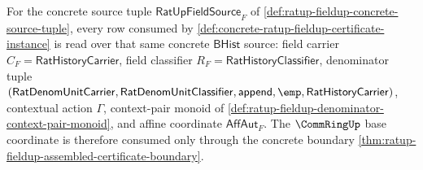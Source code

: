 \begin{theorem}
\label{thm:ratup-fieldup-certificate-rows-source-anchored}
For the concrete source tuple $\mathsf{RatUpFieldSource}_F$ of
\autoref{def:ratup-fieldup-concrete-source-tuple}, every row consumed by
\autoref{def:concrete-ratup-fieldup-certificate-instance} is read over that
same concrete $\mathsf{BHist}$ source: field carrier
$C_F=\mathsf{RatHistoryCarrier}$, field classifier
$R_F=\mathsf{RatHistoryClassifier}$, denominator tuple
$(\mathsf{RatDenomUnitCarrier},\mathsf{RatDenomUnitClassifier},
\mathsf{append},\emp,\mathsf{RatHistoryCarrier})$, contextual action
$\Gamma$, context-pair monoid of
\autoref{def:ratup-fieldup-denominator-context-pair-monoid}, and affine
coordinate $\mathsf{AffAut}_F$. The $\CommRingUp$ base coordinate is therefore
consumed only through the concrete boundary
\autoref{thm:ratup-fieldup-assembled-certificate-boundary}.
\end{theorem}
